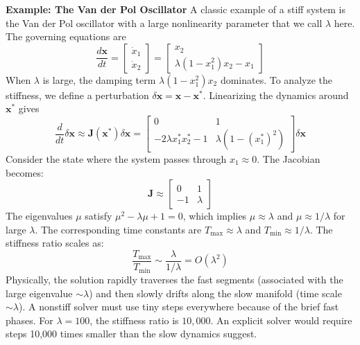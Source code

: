\begin{exampleBox}
    \textbf{Example: The Van der Pol Oscillator}
    A classic example of a stiff system is the Van der Pol oscillator with a large nonlinearity parameter that we call $\lambda$ here. The governing equations are
    \begin{equation}
        \frac{d\mathbf{x}}{dt} = \begin{bmatrix} \dot{x}_1 \\ \dot{x}_2 \end{bmatrix} = \begin{bmatrix} x_2 \\ \lambda(1 - x_1^2)x_2 - x_1 \end{bmatrix}
    \end{equation}
    When $\lambda$ is large, the damping term $\lambda(1-x_1^2)x_2$ dominates. To analyze the stiffness, we define a perturbation $\delta \mathbf{x} = \mathbf{x} - \mathbf{x}^*$. Linearizing the dynamics around $\mathbf{x}^*$ gives
    \begin{equation}
        \frac{d}{dt} \delta\mathbf{x} \approx \mathbf{J}(\mathbf{x}^*) \delta\mathbf{x} = \begin{bmatrix} 0 & 1 \\ -2\lambda x_1^* x_2^* - 1 & \lambda(1 - (x_1^*)^2) \end{bmatrix} \delta\mathbf{x}
    \end{equation}
    Consider the state where the system passes through $x_1 \approx 0$. The Jacobian becomes:
    \begin{equation}
        \mathbf{J} \approx \begin{bmatrix} 0 & 1 \\ -1 & \lambda \end{bmatrix}
    \end{equation}
    The eigenvalues $\mu$ satisfy $\mu^2 - \lambda \mu + 1 = 0$, which implies $\mu \approx \lambda$ and $\mu \approx 1/\lambda$ for large $\lambda$. The corresponding time constants are $T_{\max} \approx \lambda$ and $T_{\min} \approx 1/\lambda$. The stiffness ratio scales as:
    \begin{equation}
        \frac{T_{\max}}{T_{\min}} \sim \frac{\lambda}{1/\lambda} = O(\lambda^2)
    \end{equation}
    Physically, the solution rapidly traverses the fast segments (associated with the large eigenvalue $\sim \lambda$) and then slowly drifts along the slow manifold (time scale $\sim \lambda$). A nonstiff solver must use tiny steps everywhere because of the brief fast phases. For $\lambda = 100$, the stiffness ratio is $10,000$. An explicit solver would require steps 10,000 times smaller than the slow dynamics suggest.


\end{exampleBox}
